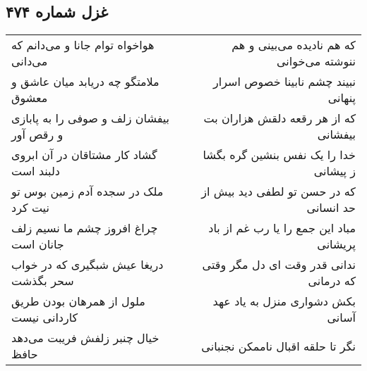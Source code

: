 \begin{center}
\section*{غزل شماره ۴۷۴}
\label{sec:sh474}
\begin{longtable}{l p{0.5cm} r}
هواخواه توام جانا و می‌دانم که می‌دانی
&&
که هم نادیده می‌بینی و هم ننوشته می‌خوانی
\\
ملامتگو چه دریابد میان عاشق و معشوق
&&
نبیند چشم نابینا خصوص اسرار پنهانی
\\
بیفشان زلف و صوفی را به پابازی و رقص آور
&&
که از هر رقعه دلقش هزاران بت بیفشانی
\\
گشاد کار مشتاقان در آن ابروی دلبند است
&&
خدا را یک نفس بنشین گره بگشا ز پیشانی
\\
ملک در سجده آدم زمین بوس تو نیت کرد
&&
که در حسن تو لطفی دید بیش از حد انسانی
\\
چراغ افروز چشم ما نسیم زلف جانان است
&&
مباد این جمع را یا رب غم از باد پریشانی
\\
دریغا عیش شبگیری که در خواب سحر بگذشت
&&
ندانی قدر وقت ای دل مگر وقتی که درمانی
\\
ملول از همرهان بودن طریق کاردانی نیست
&&
بکش دشواری منزل به یاد عهد آسانی
\\
خیال چنبر زلفش فریبت می‌دهد حافظ
&&
نگر تا حلقه اقبال ناممکن نجنبانی
\\
\end{longtable}
\end{center}
